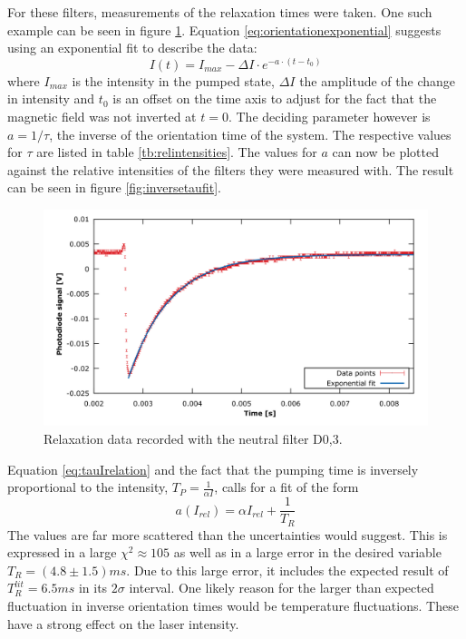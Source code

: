 For these filters, measurements of the relaxation times were taken. One such example can be seen in figure \ref{fig:dehmletexample}. Equation \ref{eq:orientationexponential} suggests using an exponential fit to describe the data:
\begin{equation}
I(t)=I_{max}-\Delta I\cdot e^{-a\cdot(t-t_0)}
\end{equation}
where $I_{max}$ is the intensity in the pumped state, $\Delta I$ the amplitude of the change in intensity and $t_0$ is an offset on the time axis to adjust for the fact that the magnetic field was not inverted at $t=0$. The deciding parameter however is $a=1/\tau$, the inverse of the orientation time of the system. The respective values for $\tau$ are listed in table \ref{tb:relintensities}. The values for $a$ can now be plotted against the relative intensities of the filters they were measured with. The result can be seen in figure \ref{fig:inversetaufit}.\\
\begin{figure}
\centering
\includegraphics[width=1.0\linewidth]{graphics/dehmletexample}
\caption[Example of Dehmelt relaxation]{Relaxation data recorded with the neutral filter D0,3.}
\label{fig:dehmletexample}
\end{figure}
Equation \ref{eq:tauIrelation} and the fact that the pumping time is inversely proportional to the intensity, $T_P=\frac{1}{\alpha I}$, calls for a fit of the form
\begin{equation}
a(I_{rel})=\alpha I_{rel} + \frac{1}{T_R}
\end{equation}
The values are far more scattered than the uncertainties would suggest. This is expressed in a large $\chi^2\approx105$ as well as in a large error in the desired variable $T_R=\unit{(4.8\pm1.5)}{ms}$. Due to this large error, it includes the expected result of $T_R^{lit}=\unit{6.5}{ms}$ in its $2\sigma$ interval. One likely reason for the larger than expected fluctuation in inverse orientation times would be temperature fluctuations. These have a strong effect on the laser intensity.\\
